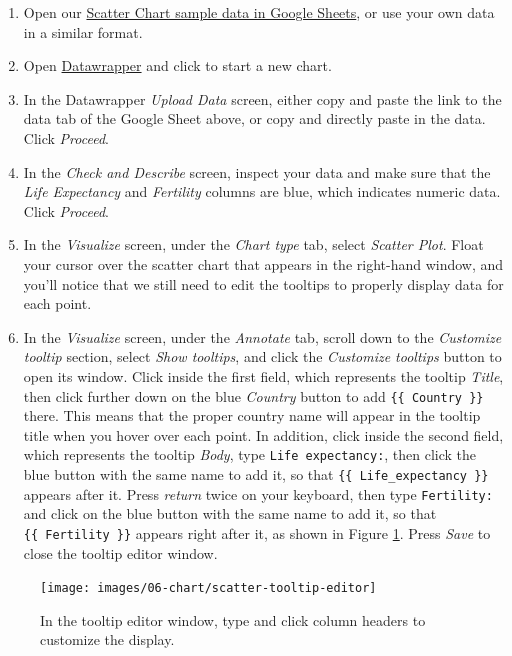 \documentclass[
  english,
]{book}
\begin{document}
\begin{enumerate}
\def\labelenumi{\arabic{enumi}.}
\item
  Open our \href{https://docs.google.com/spreadsheets/d/1bKY6RSNOXnwUMbLclEwHC_E9meLmwlfTcnxOF85wUjA/edit\#gid=0}{Scatter Chart sample data in Google Sheets}, or use your own data in a similar format.
\item
  Open \href{https://www.datawrapper.de}{Datawrapper} and click to start a new chart.
\item
  In the Datawrapper \emph{Upload Data} screen, either copy and paste the link to the data tab of the Google Sheet above, or copy and directly paste in the data. Click \emph{Proceed}.
\item
  In the \emph{Check and Describe} screen, inspect your data and make sure that the \emph{Life Expectancy} and \emph{Fertility} columns are blue, which indicates numeric data. Click \emph{Proceed}.
\item
  In the \emph{Visualize} screen, under the \emph{Chart type} tab, select \emph{Scatter Plot}. Float your cursor over the scatter chart that appears in the right-hand window, and you'll notice that we still need to edit the tooltips to properly display data for each point.
\item
  In the \emph{Visualize} screen, under the \emph{Annotate} tab, scroll down to the \emph{Customize tooltip} section, select \emph{Show tooltips}, and click the \emph{Customize tooltips} button to open its window. Click inside the first field, which represents the tooltip \emph{Title}, then click further down on the blue \emph{Country} button to add \texttt{\{\{\ Country\ \}\}} there. This means that the proper country name will appear in the tooltip title when you hover over each point. In addition, click inside the second field, which represents the tooltip \emph{Body}, type \texttt{Life\ expectancy:}, then click the blue button with the same name to add it, so that \texttt{\{\{\ Life\_expectancy\ \}\}} appears after it. Press \emph{return} twice on your keyboard, then type \texttt{Fertility:} and click on the blue button with the same name to add it, so that \texttt{\{\{\ Fertility\ \}\}} appears right after it, as shown in Figure \ref{fig:scatter-tooltip-editor}. Press \emph{Save} to close the tooltip editor window.
\end{enumerate}



\begin{figure}
\texttt{[image: images/06-chart/scatter-tooltip-editor]} \caption{In the tooltip editor window, type and click column headers to customize the display.}\label{fig:scatter-tooltip-editor}
\end{figure}
\end{document}
